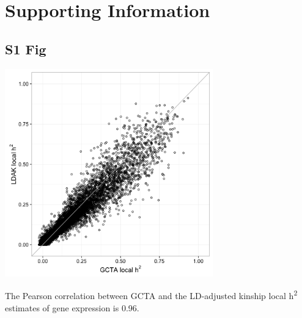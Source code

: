 \documentclass[10pt,letterpaper]{article}
\begin{document}
\nolinenumbers


%
%
% 



\section*{Supporting Information}

\begin{singlespace}


\subsection*{S1 Fig}
\includegraphics[width=9cm]{Figures/Fig-LDAK-gcta-no-cons.png}
\label{S1_Fig}

 The Pearson correlation between GCTA and the LD-adjusted kinship local h\textsuperscript{2} estimates of gene expression is 0.96.


\end{singlespace}
\end{document}
